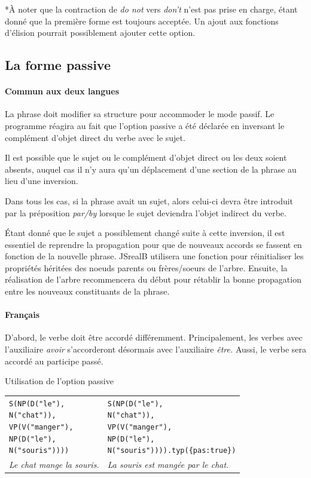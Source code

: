 \documentclass[11pt]{article} %
\newcommand{\system}[1]{\textsf{#1}}
\newcommand{\JSB}{\system{JSrealB}}
\newcommand{\real}[1]{\emph{#1}}
\begin{document}
{*}À noter que la contraction de \emph{do not }vers \emph{don't} n'est
pas prise en charge, étant donné que la première forme est toujours
acceptée. Un ajout aux fonctions d'élision pourrait possiblement ajouter
cette option.

\subsection{La forme passive}

\paragraph{Commun aux deux langues}

La phrase doit  modifier sa
structure pour accommoder le mode passif. Le programme réagira au
fait que l'option passive a été déclarée en inversant le complément
d'objet direct du verbe avec le sujet. 

Il est possible que le sujet ou le complément d'objet direct ou les deux soient absents, auquel cas
il n'y aura qu'un déplacement d'une section de la phrase au lieu d'une
inversion. 

Dans tous les cas, si la phrase avait un sujet, alors celui-ci devra être 
introduit par la préposition \real{par/by} lorsque le sujet deviendra  l'objet indirect du verbe.

Étant donné que le sujet a possiblement changé suite à
cette inversion, il est essentiel de reprendre la propagation
pour que de nouveaux accords se fassent en fonction de la nouvelle
phrase. \JSB{} utilisera une fonction pour réinitialiser les propriétés
héritées des noeuds parents ou frères/soeurs de l'arbre. Ensuite,
la réalisation de l'arbre recommencera du début pour rétablir la bonne
propagation entre les nouveaux constituants de la phrase.

\paragraph{Français}
D'abord, le verbe doit être accordé différemment. Principalement,
les verbes avec l'auxiliaire \emph{avoir} s'accorderont désormais
avec l'auxiliaire \emph{être.} Aussi, le verbe sera accordé au participe
passé.

\begin{example}
\caption{Utilisation de l'option passive}
\begin{tabular}{p{7cm} p{7cm}}
\begin{alltt}
S(NP(D("le"),
     N("chat")),
  VP(V("manger"),
     NP(D("le"),
        N("souris"))))
\end{alltt} &
\begin{alltt}
S(NP(D("le"),
     N("chat")),
  VP(V("manger"),
     NP(D("le"),
        N("souris")))).typ(\{pas:true\})
\end{alltt}
\\
\real{Le chat mange la souris.} & \real{La souris est mangée par le chat.}
\end{tabular}
\label{passif}
\end{example}
\end{document}
